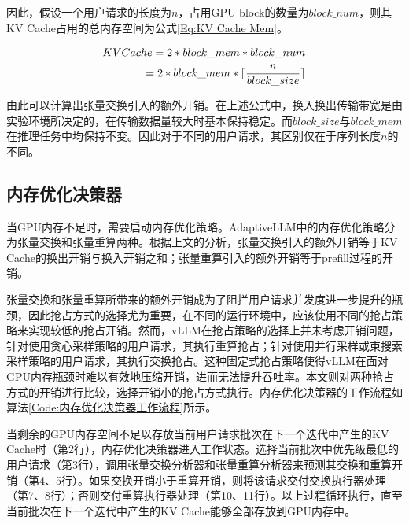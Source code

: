 因此，假设一个用户请求的长度为$n$，占用GPU block的数量为$block\_num$，则其KV Cache占用的总内存空间为公式\ref{Eq:KV Cache Mem}。

\begin{equation}
  \begin{aligned}
    KVCache = 2 * block\_mem * block\_num  \\ =  2 * block\_mem * \lceil \frac{n}{block\_size} \rceil
  \end{aligned}
  \label{Eq:KV Cache Mem}
  \setlength{\abovedisplayskip}{0ex}
  \setlength{\belowdisplayskip}{2ex}
\end{equation}

由此可以计算出张量交换引入的额外开销。在上述公式中，换入换出传输带宽是由实验环境所决定的，在传输数据量较大时基本保持稳定。而$block\_size$与$block\_mem$在推理任务中均保持不变。因此对于不同的用户请求，其区别仅在于序列长度$n$的不同。

\subsection{内存优化决策器}

当GPU内存不足时，需要启动内存优化策略。AdaptiveLLM中的内存优化策略分为张量交换和张量重算两种。根据上文的分析，张量交换引入的额外开销等于KV Cache的换出开销与换入开销之和；张量重算引入的额外开销等于prefill过程的开销。\par

张量交换和张量重算所带来的额外开销成为了阻拦用户请求并发度进一步提升的瓶颈，因此抢占方式的选择尤为重要，在不同的运行环境中，应该使用不同的抢占策略来实现较低的抢占开销。然而，vLLM在抢占策略的选择上并未考虑开销问题，针对使用贪心采样策略的用户请求，其执行重算抢占；针对使用并行采样或束搜索采样策略的用户请求，其执行交换抢占。这种固定式抢占策略使得vLLM在面对GPU内存瓶颈时难以有效地压缩开销，进而无法提升吞吐率。本文则对两种抢占方式的开销进行比较，选择开销小的抢占方式执行。内存优化决策器的工作流程如算法\ref{Code:内存优化决策器工作流程}所示。\par

当剩余的GPU内存空间不足以存放当前用户请求批次在下一个迭代中产生的KV Cache时（第2行），内存优化决策器进入工作状态。选择当前批次中优先级最低的用户请求（第3行），调用张量交换分析器和张量重算分析器来预测其交换和重算开销（第4、5行）。如果交换开销小于重算开销，则将该请求交付交换执行器处理（第7、8行）；否则交付重算执行器处理（第10、11行）。以上过程循环执行，直至当前批次在下一个迭代中产生的KV Cache能够全部存放到GPU内存中。 

